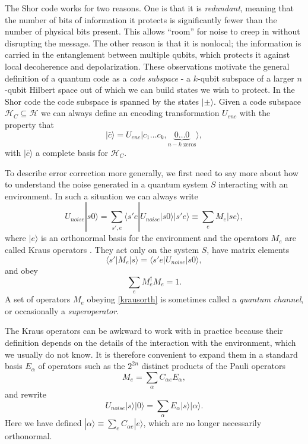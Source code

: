 \documentclass[12pt]{article}
\newcommand{\be}{\begin{equation}}
\newcommand{\ee}{\end{equation}}
\newcommand{\lan}{\langle}
\newcommand{\ran}{\rangle}
\begin{document}
The Shor code works for two reasons.  One is that it is \textit{redundant}, meaning that the number of bits of information it protects is significantly fewer than the number of physical bits present.  This allows ``room'' for noise to creep in without disrupting the message.  The other reason is that it is nonlocal; the information is carried in the entanglement between multiple qubits, which protects it against local decoherence and depolarization.  These observations motivate the general definition of a quantum code as a \textit{code subspace} - a $k$-qubit subspace of a larger $n$-qubit Hilbert space out of which we can build states we wish to protect.  In the Shor code the code subspace is spanned by the states $|\pm\ran$.  Given a code subspace $\mathcal{H}_C\subseteq\mathcal{H}$ we can always define an encoding transformation $U_{enc}$ with the property that
\be\label{encoding}
|\bar{c}\ran=U_{enc}|c_1\ldots c_k,\underbrace{0\ldots 0}_{n-k\text{ zeros}}\ran,
\ee
with $|\bar{c}\ran$ a complete basis for $\mathcal{H}_C$.  

To describe error correction more generally, we first need to say more about how to understand the noise generated in a quantum system $S$ interacting with an environment.  In such a situation we can always write
\be \label{eqnUnoise}
U_{noise}|s0\ran=\sum_{s',e}\lan s'e|U_{noise}|s0\ran|s'e\ran\equiv \sum_e M_e|se\ran,
\ee
where $|e\ran$ is an orthonormal basis for the environment and the operators $M_e$ are called Kraus operators \cite{kraus1983states}.  They act only on the system $S$, have matrix elements 
\be
\lan s'|M_e|s\ran=\lan s'e|U_{noise}|s0\ran, 
\ee
and obey
\be\label{krausorth}
\sum_e M_e^\dagger M_e=1.
\ee
A set of operators $M_e$ obeying \eqref{krausorth} is sometimes called a \textit{quantum channel}, or occasionally a \textit{superoperator}.

The Kraus operators can be awkward to work with in practice because their definition depends on the details of the interaction with the environment, which we usually do not know.  It is therefore convenient to expand them in a standard basis $E_\alpha$ of operators such as the $2^{2n}$ distinct products of the Pauli operators
\be
M_e=\sum_\alpha C_{\alpha e} E_\alpha,
\ee
and rewrite
\be\label{Eerr}
U_{noise}|s\ran|0\ran=\sum_\alpha E_\alpha|s\ran|\alpha\ran.
\ee
Here we have defined $|\alpha\ran\equiv \sum_e C_{\alpha e}|e\ran$, which are no longer necessarily orthonormal.  
\end{document}
